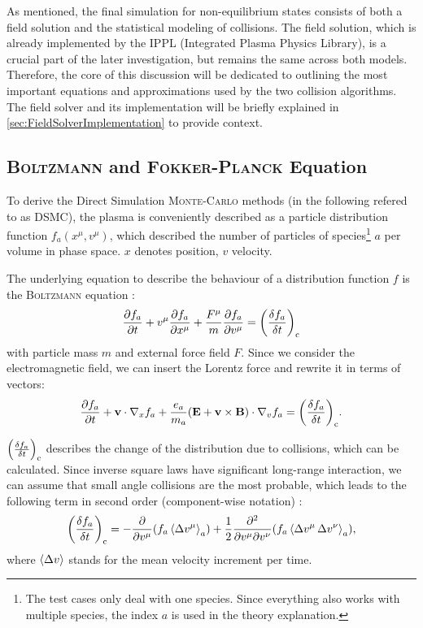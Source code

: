 As mentioned, the final simulation for non-equilibrium states consists of both a field solution and the statistical modeling of collisions. The field solution, which is already implemented by the IPPL (Integrated Plasma Physics Library), is a crucial part of the later investigation, but remains the same across both models. Therefore, the core of this discussion will be dedicated to outlining the most important equations and approximations used by the two collision algorithms. \\
The field solver and its implementation will be briefly explained in \ref{sec:FieldSolverImplementation} to provide context. 


\subsection{\textsc{Boltzmann} and \textsc{Fokker-Planck} Equation}

To derive the Direct Simulation \textsc{Monte-Carlo} methods (in the following refered to as DSMC), the plasma is conveniently described as a particle distribution function $f_a(x^\mu, v^\mu)$, which described the number of particles of species\footnote{The test cases only deal with one species. Since everything also works with multiple species, the index $a$ is used in the theory explanation.} $a$ per volume in phase space. $x$ denotes position, $v$ velocity.

The underlying equation to describe the behaviour of a distribution function $f$ is the \textsc{Boltzmann} equation \cite[1]{Rosenbluth1957}:
\begin{equation*}
    \pdv{f_a}{t} + v^\mu \pdv{f_a}{x^\mu} + \frac{F^\mu}{m} \pdv{f_a}{v^\mu} = \qty(\fdv{f_a}{t})_\mathrm{c}
\end{equation*}
with particle mass $m$ and external force field $F$. Since we consider the electromagnetic field, we can insert the Lorentz force and rewrite it in terms of vectors:
\begin{equation*}
    \pdv{f_a}{t} + \mathbf{v} \cdot \nabla_x f_a + \frac{e_a}{m_a} \qty(\mathbf{E} + \mathbf{v} \times \mathbf{B}) \cdot \nabla_v f_a = \qty(\fdv{f_a}{t})_\mathrm{c} .
\end{equation*}

$\qty(\fdv{f_a}{t})_\mathrm{c}$ describes the change of the distribution due to collisions, which can be calculated. Since inverse square laws have significant long-range interaction, we can assume that small angle collisions are the most probable, which leads to the following term in second order (component-wise notation) \cite[2]{Rosenbluth1957}:
\begin{equation}
    \qty(\fdv{f_a}{t})_\mathrm{c} = - \pdv{v^\mu} \qty(f_a \expval{\Delta v^\mu}_a) + \frac{1}{2} \pdv{}{v^\mu}{v^\nu} \qty(f_a \expval{\Delta v^\mu \, \Delta v^\nu}_a) , \label{eq:2.1:fokkerplanck_base}
\end{equation}
where $\expval{\Delta v}$ stands for the mean velocity increment per time.

